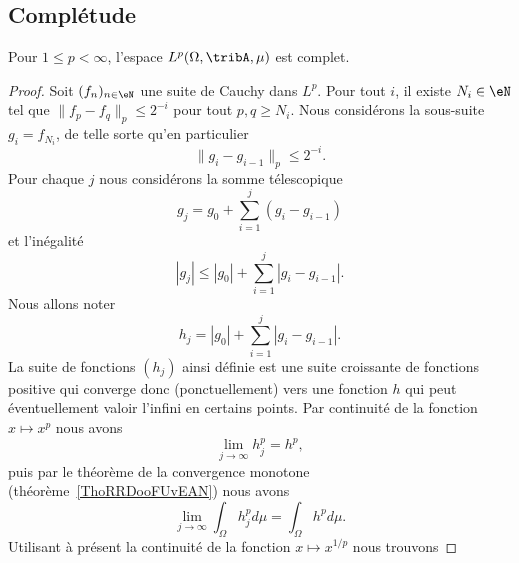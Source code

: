 \subsection{Complétude}

\begin{theorem}  \label{ThoUYBDWQX}
	Pour \( 1\leq p<\infty\), l'espace \( L^p(\Omega,\tribA,\mu)\) est complet.
\end{theorem}

\begin{proof}
	Soit \( (f_n)_{n\in\eN}\) une suite de Cauchy dans \( L^p\). Pour tout \( i\), il existe \( N_i\in\eN\) tel que \( \| f_p-f_q \|_p\leq 2^{-i}\) pour tout \( p,q\geq N_i\). Nous considérons la sous-suite \( g_i=f_{N_i}\), de telle sorte qu'en particulier
	\begin{equation}    \label{EqJLoDID}
		\|g_i-g_{i-1}\|_p\leq 2^{-i}.
	\end{equation}
	Pour chaque \( j\) nous considérons la somme télescopique
	\begin{equation}
		g_j=g_0+\sum_{i=1}^j(g_i-g_{i-1})
	\end{equation}
	et l'inégalité
	\begin{equation}
		| g_j |\leq | g_0 |+\sum_{i=1}^j| g_i-g_{i-1} |.
	\end{equation}
	Nous allons noter
	\begin{equation}        \label{EqSomPaFPQOWC}
		h_j=| g_0 |+\sum_{i=1}^j| g_i-g_{i-1} |.
	\end{equation}
	La suite de fonctions \( (h_j)\) ainsi définie est une suite croissante de fonctions positive qui converge donc (ponctuellement) vers une fonction \( h\) qui peut éventuellement valoir l'infini en certains points. Par continuité de la fonction \( x\mapsto x^p\) nous avons
	\begin{equation}
		\lim_{j\to \infty} h_j^p=h^p,
	\end{equation}
	puis par le théorème de la convergence monotone (théorème~\ref{ThoRRDooFUvEAN}) nous avons
	\begin{equation}
		\lim_{j\to \infty} \int_{\Omega}h_j^pd\mu=\int_{\Omega}h^pd\mu.
	\end{equation}
	Utilisant à présent la continuité de la fonction \( x\mapsto x^{1/p}\) nous trouvons

\end{proof}
